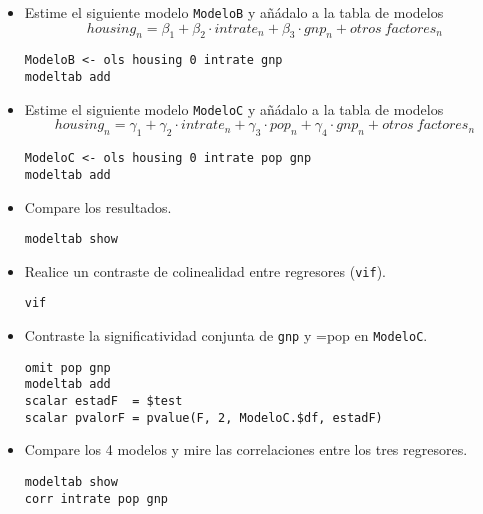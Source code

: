 \documentclass[11pt]{article}
\begin{document}
\begin{itemize}
\item Estime el siguiente modelo \texttt{ModeloB} y añádalo a la tabla de modelos
\begin{displaymath}
  housing_{n} = \beta_1 + \beta_2\cdot intrate_n +  \beta_3 \cdot gnp_n + otros\ factores_n
\end{displaymath}
{\vspace{0pt} \color{gray!70!black}
\begin{verbatim}
ModeloB <- ols housing 0 intrate gnp
modeltab add
\end{verbatim}
}

\item Estime el siguiente modelo \texttt{ModeloC} y añádalo a la tabla de modelos
\begin{displaymath}
  housing_{n} = \gamma_1 + \gamma_2\cdot intrate_n +  \gamma_3 \cdot pop_n +  \gamma_4 \cdot gnp_n + otros\ factores_n
\end{displaymath}
{\vspace{0pt} \color{gray!70!black}
\begin{verbatim}
ModeloC <- ols housing 0 intrate pop gnp
modeltab add
\end{verbatim}
}

\item Compare los resultados.
{\vspace{0pt} \color{gray!70!black}
\begin{verbatim}
modeltab show
\end{verbatim}
}

\item Realice un contraste de colinealidad entre regresores (\texttt{vif}).
{\vspace{0pt} \color{gray!70!black}
\begin{verbatim}
vif
\end{verbatim}
}

\item Contraste la significatividad conjunta de \texttt{gnp} y =pop en \texttt{ModeloC}.
{\vspace{0pt} \color{gray!70!black}
\begin{verbatim}
omit pop gnp
modeltab add
scalar estadF  = $test
scalar pvalorF = pvalue(F, 2, ModeloC.$df, estadF)
\end{verbatim}
}

\item Compare los 4 modelos y mire las correlaciones entre los tres regresores.
{\vspace{0pt} \color{gray!70!black}
\begin{verbatim}
modeltab show
corr intrate pop gnp
\end{verbatim}
}
\end{itemize}
\end{document}
